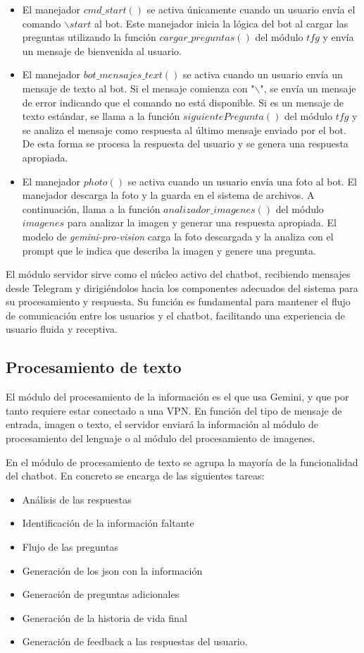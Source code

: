 \begin{itemize}
	\item El manejador $cmd\_start()$ se activa únicamente cuando un usuario envía el comando $\backslash start$ al bot. Este manejador inicia la lógica del bot al cargar las preguntas utilizando la función $cargar\_preguntas()$ del módulo $tfg$ y envía un mensaje de bienvenida al usuario.
	
	\item El manejador $bot\_mensajes\_text()$ se activa cuando un usuario envía un mensaje de texto al bot. Si el mensaje comienza con "$\backslash$", se envía un mensaje de error indicando que el comando no está disponible. Si es un mensaje de texto estándar, se llama a la función $siguientePregunta()$ del módulo $tfg$ y se analiza el mensaje como respuesta al último mensaje enviado por el bot. De esta forma se procesa la respuesta del usuario y se genera una respuesta apropiada.
	
	\item El manejador $photo()$ se activa cuando un usuario envía una foto al bot. El manejador descarga la foto y la guarda en el sistema de archivos. A continuación, llama a la función $analizador\_imagenes()$ del módulo $imagenes$ para analizar la imagen y generar una respuesta apropiada. El modelo de \textit{gemini-pro-vision} carga la foto descargada y la analiza con el prompt que le indica que describa la imagen y genere una pregunta. 
\end{itemize}

El módulo servidor sirve como el núcleo activo del chatbot, recibiendo mensajes desde Telegram y dirigiéndolos hacia los componentes adecuados del sistema para su procesamiento y respuesta. Su función es fundamental para mantener el flujo de comunicación entre los usuarios y el chatbot, facilitando una experiencia de usuario fluida y receptiva. 

\subsection{Procesamiento de texto}
El módulo del procesamiento de la información es el que usa Gemini, y que por tanto requiere estar conectado a una VPN. En función del tipo de mensaje de entrada, imagen o texto, el servidor enviará la información al módulo de procesamiento del lenguaje o al módulo del procesamiento de imagenes.

En el módulo de procesamiento de texto se agrupa la mayoría de la funcionalidad del chatbot. En concreto se encarga de las siguientes tareas: 
\begin{itemize}
	\item Análisis de las respuestas 
	\item Identificación de la información faltante
	\item Flujo de las preguntas
	\item Generación de los json con la información
	\item Generación de preguntas adicionales 
	 \item Generación de la historia de vida final
	 \item Generación de feedback a las respuestas del usuario.
\end{itemize}


